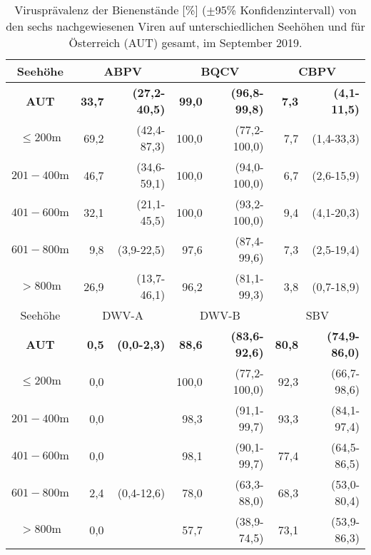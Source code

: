 \begin{table}[H]
    \caption{Virusprävalenz der Bienenstände [\%] (\(\pm \)95\% Konfidenzintervall) von den sechs nachgewiesenen Viren auf unterschiedlichen Seehöhen und für Österreich (AUT) gesamt, im September 2019.}
    \centering
    \footnotesize
    \label{tab:k:praevalenz_Seehoehe}
    \begin{tabular}{c|*{2}{rr|}rr}
        \toprule    
        \multicolumn{1}{c|}{Seehöhe} & 
        \multicolumn{2}{c|}{ABPV}   & 
        \multicolumn{2}{c|}{BQCV}   & 
        \multicolumn{2}{c}{CBPV}   \\
        \midrule
        
	    \textbf{AUT} & \textbf{33,7} & \textbf{(27,2-40,5)} & \textbf{99,0} & \textbf{(96,8-99,8)} &  \textbf{7,3} &  \textbf{(4,1-11,5)} \\
        $\leq200\si{\m}$ & 69,2 & (42,4-87,3) & 100,0 & (77,2-100,0) &  7,7 &  (1,4-33,3) \\
        $201-400\si{\m}$ & 46,7 & (34,6-59,1) & 100,0 & (94,0-100,0) &  6,7 &  (2,6-15,9) \\
        $401-600\si{\m}$ & 32,1 & (21,1-45,5) & 100,0 & (93,2-100,0) &  9,4 &  (4,1-20,3) \\
        $601-800\si{\m}$ & 9,8 & (3,9-22,5) & 97,6 & (87,4-99,6) &  7,3 &  (2,5-19,4) \\
        $>800\si{\m}$ & 26,9 & (13,7-46,1) & 96,2 & (81,1-99,3) &  3,8 &  (0,7-18,9) \\
        
        \midrule    
        \multicolumn{1}{c|}{Seehöhe} & 
        \multicolumn{2}{c|}{DWV-A}   & 
        \multicolumn{2}{c|}{DWV-B}   & 
        \multicolumn{2}{c}{SBV}   \\
        \midrule

	    \textbf{AUT} & \textbf{0,5} & \textbf{(0,0-2,3)} & \textbf{88,6} & \textbf{(83,6-92,6)} &  \textbf{80,8} &  \textbf{(74,9-86,0)} \\
        $\leq200\si{\m}$ & 0,0 &         & 100,0 & (77,2-100,0) &  92,3 &  (66,7-98,6) \\
        $201-400\si{\m}$ & 0,0 &         & 98,3 & (91,1-99,7) &  93,3 &  (84,1-97,4) \\
        $401-600\si{\m}$ & 0,0 &         & 98,1 & (90,1-99,7) &  77,4 &  (64,5-86,5) \\
        $601-800\si{\m}$ & 2,4 & (0,4-12,6) & 78,0 & (63,3-88,0) &  68,3 &  (53,0-80,4) \\
        $>800\si{\m}$ & 0,0 &        & 57,7 & (38,9-74,5) &  73,1 &  (53,9-86,3) \\
        

        \bottomrule
    \end{tabular}

\end{table}